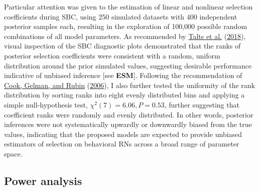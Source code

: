\documentclass{article}
\begin{document}
Particular attention was given to the estimation of linear and nonlinear
selection coefficients during SBC, using 250 simulated datasets with 400
independent posterior samples each, resulting in the exploration of
100,000 possible random combinations of all model parameters. As
recommended by \protect\hyperlink{ref-Talts2018}{Talts et al.}
(\protect\hyperlink{ref-Talts2018}{2018}), visual inspection of the SBC
diagnostic plots demonstrated that the ranks of posterior selection
coefficients were consistent with a random, uniform distribution around
the prior simulated values, suggesting desirable performance indicative
of unbiased inference {[}see \textbf{ESM}{]}. Following the
recommendation of \protect\hyperlink{ref-Cook2006}{Cook, Gelman, and
Rubin} (\protect\hyperlink{ref-Cook2006}{2006}), I also further tested
the uniformity of the rank distribution by sorting ranks into eight
evenly distributed bins and applying a simple null-hypothesis test,
\(\chi^2(7)=6.06, P = 0.53\), further suggesting that coefficient ranks
were randomly and evenly distributed. In other words, posterior
inferences were not systematically upwardly or downwardly biased from
the true values, indicating that the proposed models are expected to
provide unbiased estimators of selection on behavioral RNs across a
broad range of parameter space.

\hypertarget{power-analysis}{%
\subsection{Power analysis}\label{power-analysis}}
\end{document}
